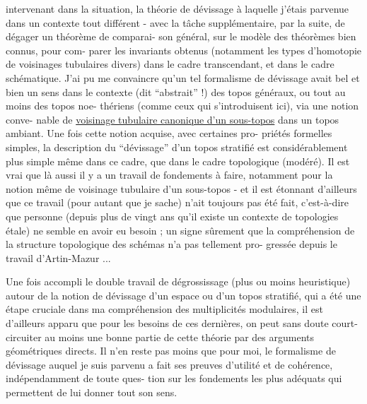 
intervenant dans la situation, la théorie de dévissage à laquelle
j'étais parvenue dans un contexte tout différent - avec la tâche
supplémentaire, par la suite, de dégager un théorème de comparai-%
son général, sur le modèle des théorèmes bien connus, pour com-%
parer les invariants obtenus (notamment les types d'homotopie de
voisinages tubulaires divers) dans le cadre transcendant, et dans
le cadre schématique. J'ai pu me convaincre qu'un tel formalisme
de dévissage avait bel et bien un sens dans le contexte (dit
``abstrait'' !) des topos généraux, ou tout au moins des topos noe-%
thériens (comme ceux qui s'introduisent ici), via une notion conve-%
nable de \uline{voisinage tubulaire canonique d'un sous-topos} dans un
topos ambiant. Une fois cette notion acquise, avec certaines pro-%
priétés formelles simples, la description du ``dévissage'' d'un
topos stratifié est considérablement plus simple même dans ce
cadre, que dans le cadre topologique (modéré). Il est vrai que
là aussi il y a un travail de fondements à faire, notamment pour
la notion même de voisinage tubulaire d'un sous-topos - et il est
étonnant d'ailleurs que ce travail (pour autant que je sache)
n'ait toujours pas été fait, c'est-à-dire que personne (depuis plus
de vingt ans qu'il existe un contexte de topologies étale) ne
semble en avoir eu besoin ; un signe sûrement que la compréhension
de la structure topologique des schémas n'a pas tellement pro-%
gressée depuis le travail d'Artin-Mazur ...

Une fois accompli le double travail de dégrossissage
(plus ou moins heuristique) autour de la notion de dévissage d'un
espace ou d'un topos stratifié, qui a été une étape cruciale dans
ma compréhension des multiplicités modulaires, il est d'ailleurs
apparu que pour les besoins de ces dernières, on peut sans doute
court-circuiter au moins une bonne partie de cette théorie par des
arguments géométriques directs. Il n'en reste pas moins que pour
moi, le formalisme de dévissage auquel je suis parvenu a fait ses
preuves d'utilité et de cohérence, indépendamment de toute ques-%
tion sur les fondements les plus adéquats qui permettent de lui
donner tout son sens.

